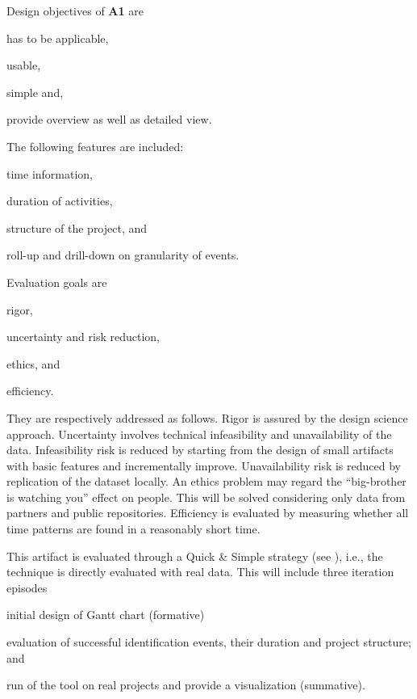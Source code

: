 \documentclass[a4paper,11pt]{article}
\begin{document}
Design objectives of \textbf{A1} are \begin{iiilist}
	\item has to be applicable, 
	\item usable, 
	\item simple and,
	\item provide overview as well as detailed view.
\end{iiilist} 
The following features are included: 
\begin{iiilist}
	\item time information,
	\item duration of activities,
	\item structure of the project, and
	\item roll-up and drill-down on granularity of events.
\end{iiilist}
Evaluation goals are 
\begin{iiilist}
\item rigor,
\item uncertainty and risk reduction,
\item ethics, and
\item efficiency.
\end{iiilist}
They are respectively addressed as follows. Rigor is assured by the design science approach. Uncertainty involves technical infeasibility and unavailability of the data. Infeasibility risk is reduced by starting from the design of small artifacts with basic features and incrementally improve. Unavailability risk is reduced by replication of the dataset locally. An ethics problem may regard the “big-brother is watching you” effect on people. This will be solved considering only data from partners and public repositories. Efficiency is evaluated by measuring whether all time patterns are found in a reasonably short time.

This artifact is evaluated through a Quick \& Simple strategy (see \cite{Venable2016}), i.e., the technique is directly evaluated with real data. This will include three iteration episodes 
	\begin{iiilist}
		\item initial design of Gantt chart (formative)
		\item evaluation of successful identification events, their duration and project structure; and 
		\item run of the tool on real projects and provide a visualization (summative).
	\end{iiilist}
\end{document}
